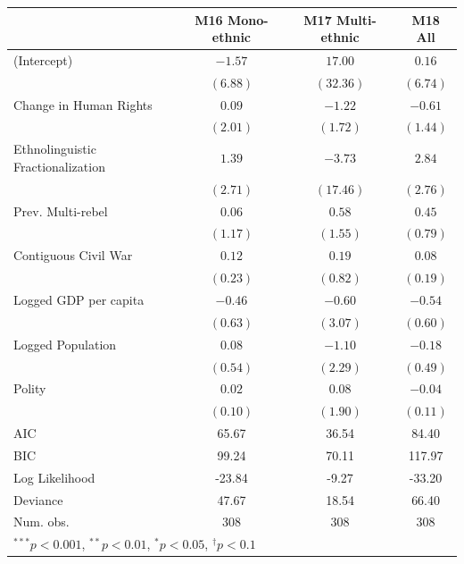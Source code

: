 \documentclass[12pt,]{book}
\let\origtable\table
\let\endorigtable\endtable
\renewenvironment{table}[1][2] {
    \singlespacing
    \expandafter\origtable\expandafter[H]
} {
    \endorigtable
}
\theoremstyle{definition}
\theoremstyle{definition}
\theoremstyle{definition}
\theoremstyle{remark}
\begin{document}
\begin{table}
\begin{center}
\begin{tabular}{l c c c }
\hline
 & M16 Mono-ethnic & M17 Multi-ethnic & M18 All \\
\hline
(Intercept)                       & $-1.57$  & $17.00$   & $0.16$   \\
                                  & $(6.88)$ & $(32.36)$ & $(6.74)$ \\
Change in Human Rights            & $0.09$   & $-1.22$   & $-0.61$  \\
                                  & $(2.01)$ & $(1.72)$  & $(1.44)$ \\
Ethnolinguistic Fractionalization & $1.39$   & $-3.73$   & $2.84$   \\
                                  & $(2.71)$ & $(17.46)$ & $(2.76)$ \\
Prev. Multi-rebel                 & $0.06$   & $0.58$    & $0.45$   \\
                                  & $(1.17)$ & $(1.55)$  & $(0.79)$ \\
Contiguous Civil War              & $0.12$   & $0.19$    & $0.08$   \\
                                  & $(0.23)$ & $(0.82)$  & $(0.19)$ \\
Logged GDP per capita             & $-0.46$  & $-0.60$   & $-0.54$  \\
                                  & $(0.63)$ & $(3.07)$  & $(0.60)$ \\
Logged Population                 & $0.08$   & $-1.10$   & $-0.18$  \\
                                  & $(0.54)$ & $(2.29)$  & $(0.49)$ \\
Polity                            & $0.02$   & $0.08$    & $-0.04$  \\
                                  & $(0.10)$ & $(1.90)$  & $(0.11)$ \\
\hline
AIC                               & 65.67    & 36.54     & 84.40    \\
BIC                               & 99.24    & 70.11     & 117.97   \\
Log Likelihood                    & -23.84   & -9.27     & -33.20   \\
Deviance                          & 47.67    & 18.54     & 66.40    \\
Num. obs.                         & 308      & 308       & 308      \\
\hline
\multicolumn{4}{l}{\scriptsize{$^{***}p<0.001$, $^{**}p<0.01$, $^*p<0.05$, $^{\dagger}p<0.1$}}
\end{tabular}
\caption{Rare Events Logit Models of Alliance Formation (Conflict-Years with > 1000 Fatalities Only)}
\label{tab:alliance-war}
\end{center}
\end{table}
\end{document}
